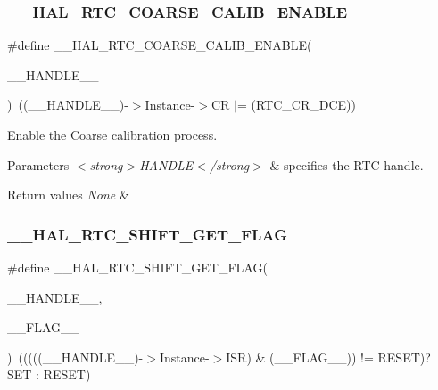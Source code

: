 \subsubsection{\texorpdfstring{\+\_\+\+\_\+\+H\+A\+L\+\_\+\+R\+T\+C\+\_\+\+C\+O\+A\+R\+S\+E\+\_\+\+C\+A\+L\+I\+B\+\_\+\+E\+N\+A\+B\+LE}{\_\_HAL\_RTC\_COARSE\_CALIB\_ENABLE}}
{\footnotesize\ttfamily \#define \+\_\+\+\_\+\+H\+A\+L\+\_\+\+R\+T\+C\+\_\+\+C\+O\+A\+R\+S\+E\+\_\+\+C\+A\+L\+I\+B\+\_\+\+E\+N\+A\+B\+LE(\begin{DoxyParamCaption}\item[{}]{\+\_\+\+\_\+\+H\+A\+N\+D\+L\+E\+\_\+\+\_\+ }\end{DoxyParamCaption})~((\+\_\+\+\_\+\+H\+A\+N\+D\+L\+E\+\_\+\+\_\+)-\/$>$Instance-\/$>$CR $\vert$= (R\+T\+C\+\_\+\+C\+R\+\_\+\+D\+CE))}



Enable the Coarse calibration process. 


\begin{DoxyParams}{Parameters}
{\em $<$strong$>$\+H\+A\+N\+D\+L\+E$<$/strong$>$} & specifies the R\+TC handle. \\
\hline
\end{DoxyParams}

\begin{DoxyRetVals}{Return values}
{\em None} & \\
\hline
\end{DoxyRetVals}
\mbox{\label{group___r_t_c_ex___calibration_ga5e1482310c213248d8416b24a5e6b3f3}} 
\subsubsection{\texorpdfstring{\+\_\+\+\_\+\+H\+A\+L\+\_\+\+R\+T\+C\+\_\+\+S\+H\+I\+F\+T\+\_\+\+G\+E\+T\+\_\+\+F\+L\+AG}{\_\_HAL\_RTC\_SHIFT\_GET\_FLAG}}
{\footnotesize\ttfamily \#define \+\_\+\+\_\+\+H\+A\+L\+\_\+\+R\+T\+C\+\_\+\+S\+H\+I\+F\+T\+\_\+\+G\+E\+T\+\_\+\+F\+L\+AG(\begin{DoxyParamCaption}\item[{}]{\+\_\+\+\_\+\+H\+A\+N\+D\+L\+E\+\_\+\+\_\+,  }\item[{}]{\+\_\+\+\_\+\+F\+L\+A\+G\+\_\+\+\_\+ }\end{DoxyParamCaption})~(((((\+\_\+\+\_\+\+H\+A\+N\+D\+L\+E\+\_\+\+\_\+)-\/$>$Instance-\/$>$I\+SR) \& (\+\_\+\+\_\+\+F\+L\+A\+G\+\_\+\+\_\+)) != R\+E\+S\+ET)? S\+ET \+: R\+E\+S\+ET)}



